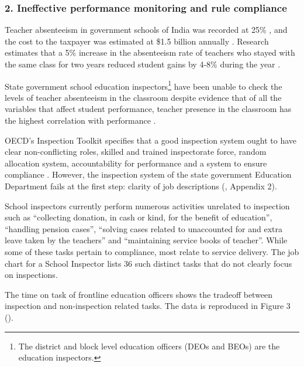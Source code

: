 \documentclass[a4paper, 12pt, twoside]{article}
\begin{document}
\subsubsection*{2. Ineffective performance monitoring and rule compliance}

Teacher absenteeism in government schools of India was recorded at 25\% \parencite{kremer_absence}, and the cost to the taxpayer was estimated at \$1.5 billion annually \parencite{karthik_m_10b}. Research estimates that a 5\% increase in the absenteeism rate of teachers who stayed with the same class for two years reduced student gains by 4-8\% during the year \parencite{das2007teacher}. 

State government school education inspectors\footnote{The district and block level education officers (DEOs and BEOs) are the education inspectors.} have been unable to check the levels of teacher absenteeism in the classroom despite evidence that of all the variables that affect student performance, teacher presence in the classroom has the highest correlation with performance \parencite{wilmawadhwa}.

OECD’s Inspection Toolkit specifies that a good inspection system ought to have clear non-conflicting roles, skilled and trained inspectorate force, random allocation system, accountability for performance and a system to ensure compliance \parencite{toolkit}. However, the inspection system of the state government Education Department fails at the first step: clarity of job descriptions (\cite{deo_chart}, Appendix 2).
 
School inspectors currently perform numerous activities unrelated to inspection such as “collecting donation, in cash or kind, for the benefit of education”, “handling pension cases”, “solving cases related to unaccounted for and extra leave taken by the teachers” and “maintaining service books of teacher”. While some of these tasks pertain to compliance, most relate to service delivery. The job chart for a School Inspector lists 36 such distinct tasks that do not clearly focus on inspections. 

The time on task of frontline education officers shows the tradeoff between inspection and non-inspection related tasks. The data is reproduced in Figure 3 (\cite{timestudy_beo}).
\end{document}
